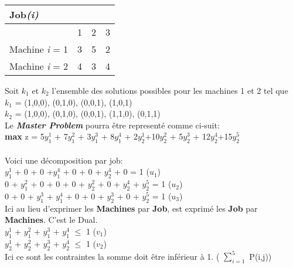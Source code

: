 \vspace{1cm}

\begin{tabular}{  p{2.5cm} c c c}
\hline
\textbf{Job}\textit{(i)} \\
\hline
 & 1 & 2 & 3 \\
 \hline
Machine \textit{i} = 1 & 3 & 5 & 2 \\
Machine \textit{i} = 2 & 4 & 3 & 4 \\
\hline
\end{tabular}

\vspace{1cm}

Soit \textit{$k_1$} et \textit{$k_2$} l'ensemble des solutions possibles pour les machines 1 et 2 tel que
\\
\textit{$k_1$} = { (1,0,0), (0,1,0), (0,0,1), (1,0,1)} \\
\textit{$k_2$} = {  (1,0,0), (0,1,0), (0,0,1), (1,1,0), (0,1,1)} \\ 

Le \textbf{\textit{Master Problem}} pourra être representé comme ci-suit:
\\
\textbf{max} z = 5$y_1^1$ + 7$y_1^2$ + 3$y_1^3$ + 8$y_1^4$ + 2$y_2^1$+10$y_2^2$ + 5$y_2^3$ + 12$y_2^4$+15$y_2^5$
\\ \\
Voici une décomposition par job: \\
$y_1^1$ + 0 + 0 +$y_1^4$ + 0 + 0 + $y_2^4$ + 0 = 1 (\textit{$u_1$}) \\
0 + $y_1^2$ + 0 + 0 + 0 + $y_2^2$ + 0 + $y_2^4$ + $y_2^5$ = 1 (\textit{$u_2$}) \\
0 + 0 + $y_1^3$ + $y_1^4$ + 0 + 0 + $y_2^3$ + 0 + $y_2^5$ = 1     (\textit{$u_3$}) \\

Ici au lieu d'exprimer les \textbf{Machines} par \textbf{Job}, est exprimé les \textbf{Job} par \textbf{Machines}. C'est le Dual.\\
$y_1^1$ + $y_1^2$ + $y_1^3$ + $y_1^4$ $\leq$ 1 (\textit{$v_1$}) \\
$y_2^1$ + $y_2^2$ + $y_2^3$ + $y_2^4$ $\leq$ 1 (\textit{$v_2$}) \\

Ici ce sont les contraintes la somme doit être inférieur à 1.
( $\sum_{i=1}^5$
 P(i,j))
